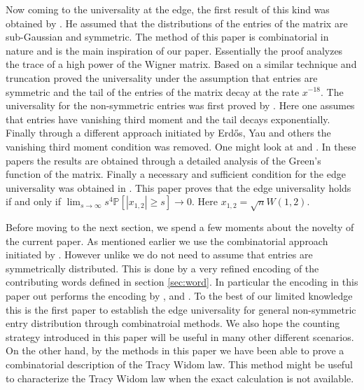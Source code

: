 \documentclass[12pt]{article}
\numberwithin{equation}{section}
\numberwithin{equation}{section}
\theoremstyle{definition}
\renewcommand{\1}{\bf 1}
\begin{document}
Now coming to the universality at the edge, the first result of this kind was obtained by \citet{sosh}. He assumed that the distributions of the entries of the matrix are sub-Gaussian and symmetric. The method of this paper is combinatorial in nature and is the main inspiration of our paper. Essentially the proof analyzes the trace of a high power of the Wigner matrix. Based on a similar technique and truncation \citet{ruzmaikina2006universality} proved the universality under the assumption that entries are symmetric and the tail of the entries of the matrix decay at the rate $x^{-18}$. The universality for the non-symmetric entries was first proved by \citet{tao2010random}. Here one assumes that entries have vanishing third moment and the tail decays exponentially. Finally through a different approach initiated by Erd\H{o}s, Yau and others the vanishing third moment condition was removed. One might look at \cite{erdHos2012rigidity} and \cite{erdHos2012spectral}. In these papers the results are obtained through a detailed analysis of the Green's function of the matrix. Finally a necessary and sufficient condition for the edge universality was obtained in \citet{lee2014necessary}. This paper proves that the edge universality holds if and only if $\lim_{s\to \infty} s^{4}\mathbb{P}\left[ \left|x_{1,2}\right| \ge s \right] \to 0.$ Here $x_{1,2}= \sqrt{n}W(1,2)$.

Before moving to the next section, we spend a few moments about the novelty of the current paper. As mentioned earlier we use the combinatorial approach initiated by \citet{sosh}. However unlike \citet{sosh} we do not need to assume that entries are symmetrically distributed. This is done by a very refined encoding of the contributing words defined in section \ref{sec:word}. In particular the encoding in this paper out performs the encoding by  \citet{furedi1981eigenvalues}, \citet{vu2005spectral} and \citet{peche2007wigner}. To the best of our limited knowledge this is the first paper to establish the edge universality for general non-symmetric entry distribution through combinatroial methods. We also hope the counting strategy introduced in this paper will be useful in many other different scenarios. On the other hand, by the methods in this paper we have been able to prove a combinatorial description of the Tracy Widom law. This method might be useful to characterize the Tracy Widom law when the exact calculation is not available.
\end{document}
